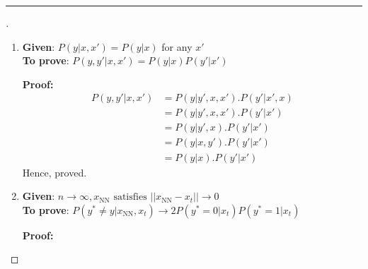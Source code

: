 \documentclass[a4paper, 12pt]{article}
\begin{document}
\hrule
\bigskip
\pagebreak
\begin{proof}[]

\hfill

\begin{enumerate}[label={\color{blue}{\textbf{2.\arabic*})}}]
    \item 
        \textbf{Given}: $P(y|x,x') = P(y|x)$ for any $x'$ \\
        \textbf{To prove}: $P(y,y'|x,x') = P(y|x)P(y'|x')$ 
        \smallskip
        
        \textbf{Proof:}
        \begin{align*}
            P(y,y'|x,x') &= P(y|y',x,x').P(y'|x',x) \tag*{(using Chain Rule)}\\
            &= P(y|y',x,x').P(y'|x') 
            \tag*{(using label independence)}\\
            &= P(y|y',x).P(y'|x') 
            \tag*{(using label independence)}\\
            &= P(y|x,y').P(y'|x') \\
            &= {P(y|x).P(y'|x')}  \tag*{(using label independence)} 
        \end{align*}
    Hence, proved.
        
    \item 
        \textbf{Given}: $n \to \infty,x_{\text{NN}} \text{ satisfies } ||x_{\text{NN}} - x_t|| \to 0$ \\
        \textbf{To prove}: $P(y^* \neq y|x_{\text{NN}},x_t) \to 2P(y^* = 0|x_t)P(y^* = 1|x_t)$ 
        \smallskip
        
        \textbf{Proof:}
        

\end{enumerate}
\end{proof}
\end{document}
